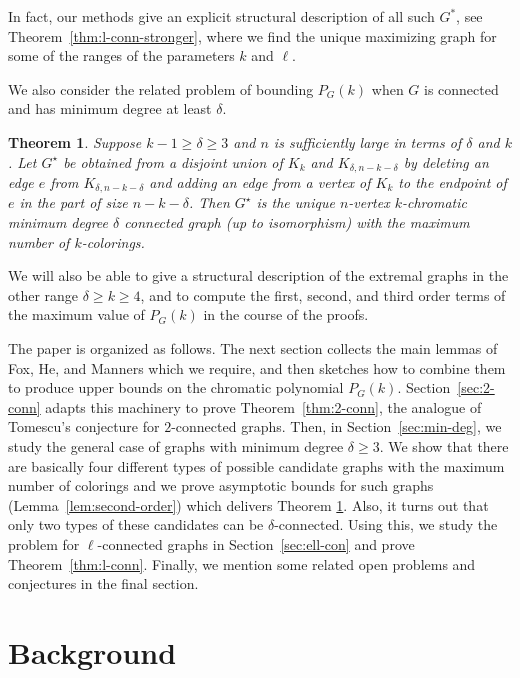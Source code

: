 \documentclass[11pt]{article}
\theoremstyle{plain}
\newtheorem{theorem}{Theorem}[section]
\theoremstyle{definition}
\theoremstyle{remark}
\begin{document}
In fact, our methods give an explicit structural description of all such $G^*$, see Theorem~\ref{thm:l-conn-stronger}, where we find the unique maximizing graph for some of the ranges of the parameters $k$ and $\ell$.

We also consider the related problem of bounding $P_G(k)$ when $G$ is connected and has minimum degree at least $\delta$. 

\begin{theorem}\label{thm-mindeg1}
Suppose $k-1\ge \delta \ge 3$ and $n$ is sufficiently large in terms of $\delta$ and $k$. Let $G^\star$ be obtained from a disjoint union of $K_{k}$ and $K_{\delta,n-k-\delta}$ by deleting an edge $e$ from $K_{\delta,n-k-\delta}$ and adding an edge from a vertex of $K_{k}$ to the endpoint of $e$ in the part of size $n-k-\delta$. Then $G^\star$ is the unique $n$-vertex $k$-chromatic minimum degree $\delta$ connected graph (up to isomorphism) with the maximum number of $k$-colorings. 
\end{theorem}

We will also be able to give a structural description of the extremal graphs in the other range $\delta \geq k \geq 4$, and to compute the first, second, and third order terms of the maximum value of $P_G(k)$ in the course of the proofs.

The paper is organized as follows. The next section collects the main lemmas of Fox, He, and Manners \cite{FoHeMa} which we require, and then sketches how to combine them to produce upper bounds on the chromatic polynomial $P_G(k)$. Section~\ref{sec:2-conn} adapts this machinery to prove Theorem~\ref{thm:2-conn}, the analogue of Tomescu's conjecture for $2$-connected graphs. Then, in Section~\ref{sec:min-deg}, we study the general case of graphs with minimum degree $\delta\ge 3$. We show that there are basically four different types of possible candidate graphs with the maximum number of colorings and we prove asymptotic bounds for such graphs (Lemma~\ref{lem:second-order}) which delivers Theorem \ref{thm-mindeg1}. Also, it turns out that only two types of these candidates can be $\delta$-connected. Using this, we study the problem for $\ell$-connected graphs in Section~\ref{sec:ell-con} and prove Theorem~\ref{thm:l-conn}. Finally, we mention some related open problems and conjectures in the final section.

\section{Background}\label{sec:background}
\end{document}
